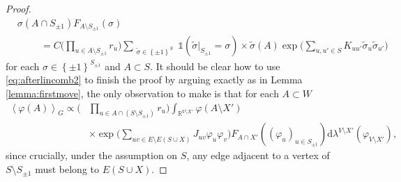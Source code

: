 \documentclass{article}
\numberwithin{equation}{section}
\theoremstyle{definition}
\theoremstyle{definition}
\theoremstyle{remark}
\renewcommand{\d}{\mathrm{d}}
\newcommand\vp{\varphi}
\newcommand\R{\mathbb{R}}
\renewcommand{\d}{\mathrm{d}}
\renewcommand{\l}{\lambda}
\renewcommand{\i}{\mathds{1}}
\newcommand{\Sis}{S_{\pm 1}}
\begin{document}
\begin{proof}
\begin{equation}
		\begin{split}
		&\sigma(A \cap \Sis) F_{A \setminus \Sis}(\sigma) \\
		&\hspace{1cm}= C   \Big( \prod_{u \in A \setminus \Sis} r_u \Big) \sum_{ \substack{ \widetilde{\sigma} \in \left\{ \pm 1 \right\}^S }} \i(\widetilde{\sigma}|_{\Sis} = \sigma) \times \widetilde{\sigma}(A)\exp\Big(\sum_{u,u' \in S} K_{uu'} \widetilde{\sigma}_u \widetilde{\sigma}_{u'}\Big)
		\end{split}
	\end{equation} 
	for each $\sigma \in \left\{ \pm 1 \right\}^{\Sis}$ and $A \subset S$.
	It should be clear how to use \eqref{eq:afterlincomb2} to finish the proof by arguing exactly as in Lemma \ref{lemma:firstmove}, the only observation to make is that for each $A \subset W$
	\begin{align*}
		\left< \vp(A) \right>_{G} \propto \Big(& \prod_{u \in A \cap  (S \setminus \Sis)} r_u \Big) \int_{\R^{V \setminus X'}} \vp(A \setminus X') \\&
		\times \exp\Big( \sum_{uv \in E \setminus E(S \cup X)} J_{uv} \vp_u \vp_v\Big ) F_{A \cap X'}((\vp_u)_{u \in \Sis})  \d\l^{V \setminus X'}(\vp_{V \setminus X'}),
	\end{align*}
	since crucially, under the assumption on $S$, any edge adjacent to a vertex of $S \setminus \Sis$ must belong to $E(S \cup X)$. 
\end{proof}
\end{document}
